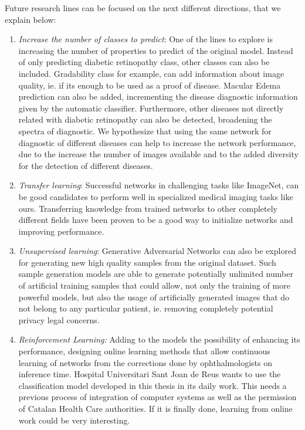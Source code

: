 Future research lines can be focused on the next different directions, that we explain below:

\begin{enumerate}

\item \emph{Increase the number of classes to predict}: One of the lines to explore is increasing the number of properties to predict of the original model. Instead of only predicting diabetic retinopathy class, other classes can also be included. Gradability class for example, can add information about image quality, ie. if its enough to be used as a proof of disease. Macular Edema prediction can also be added, incrementing the disease diagnostic information given by the automatic classifier. Furthermore, other diseases not directly related with diabetic retinopathy can also be detected, broadening the spectra of diagnostic. We hypothesize that using the same network for diagnostic of different diseases can help to increase the network performance, due to the increase the number of images available and to the added diversity for the detection of different diseases.

\item \emph{Transfer learning}: Successful networks in challenging tasks like ImageNet, can be good candidates to perform well in specialized medical imaging tasks like ours. Transferring knowledge from trained networks to other completely different fields have been proven to be a good way to initialize networks and improving performance. 

\item \emph{Unsupervised learning}: Generative Adversarial Networks can also be explored for generating new high quality samples from the original dataset. Such sample generation models are able to generate potentially unlimited number of artificial training samples that could allow, not only the training of more powerful models, but also the usage of artificially generated images that do not belong to any particular patient, ie. removing completely potential privacy legal concerns. 

\item \emph{Reinforcement Learning:} Adding to the models the possibility of enhancing its performance, designing online learning methods that allow continuous learning of networks from the corrections done by ophthalmologists on inference time. Hospital Universitari Sant Joan de Reus wants to use the classification model developed in this thesis in its daily work. This needs a previous process of integration of computer systems as well as the permission of Catalan Health Care authorities. If it is finally done, learning from online work could be very interesting.



\end{enumerate}

